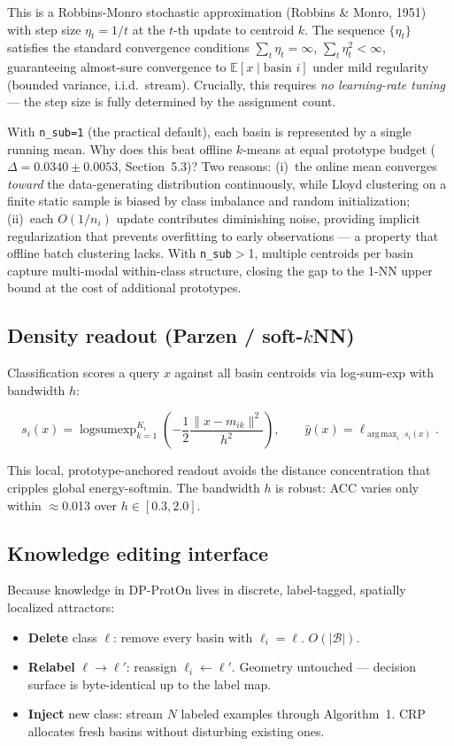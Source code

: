 \documentclass[11pt,a4paper]{article}
\DeclareMathOperator*{\logsumexp}{logsumexp}
\DeclareMathOperator*{\argmax}{arg\,max}
\begin{document}
This is a Robbins-Monro stochastic approximation (Robbins \& Monro, 1951) with step size $\eta_t = 1/t$ at the $t$-th update to centroid $k$. The sequence $\{\eta_t\}$ satisfies the standard convergence conditions $\sum_t \eta_t = \infty$, $\sum_t \eta_t^2 < \infty$, guaranteeing almost-sure convergence to $\mathbb{E}[x \mid \text{basin } i]$ under mild regularity (bounded variance, i.i.d.~stream). Crucially, this requires \textit{no learning-rate tuning} --- the step size is fully determined by the assignment count.

With \texttt{n\_sub=1} (the practical default), each basin is represented by a single running mean. Why does this beat offline $k$-means at equal prototype budget ($\Delta=0.0340\pm0.0053$, Section~5.3)? Two reasons: (i)~the online mean converges \textit{toward} the data-generating distribution continuously, while Lloyd clustering on a finite static sample is biased by class imbalance and random initialization; (ii)~each $O(1/n_i)$ update contributes diminishing noise, providing implicit regularization that prevents overfitting to early observations --- a property that offline batch clustering lacks. With \texttt{n\_sub}$>$1, multiple centroids per basin capture multi-modal within-class structure, closing the gap to the 1-NN upper bound at the cost of additional prototypes.

\subsection{Density readout (Parzen / soft-$k$NN)}

Classification scores a query $x$ against all basin centroids via log-sum-exp with bandwidth $h$:

\[
s_i(x) = \logsumexp_{k=1}^{K_i} \left(-\frac{1}{2} \frac{\lVert x - m_{ik}\rVert^2}{h^2}\right), \qquad
\hat{y}(x) = \ell_{\argmax_i \; s_i(x)}.
\]

This local, prototype-anchored readout avoids the distance concentration that cripples global energy-softmin. The bandwidth $h$ is robust: ACC varies only within $\approx$0.013 over $h\in[0.3,2.0]$.

\subsection{Knowledge editing interface}

Because knowledge in DP-ProtOn lives in discrete, label-tagged, spatially localized attractors:

\begin{itemize}[leftmargin=*]
\item \textbf{Delete} class $\ell$: remove every basin with $\ell_i=\ell$. $O(|\mathcal{B}|)$.
\item \textbf{Relabel} $\ell\to\ell'$: reassign $\ell_i \leftarrow \ell'$. Geometry untouched — decision surface is byte-identical up to the label map.
\item \textbf{Inject} new class: stream $N$ labeled examples through Algorithm~1. CRP allocates fresh basins without disturbing existing ones.
\end{itemize}
\end{document}
